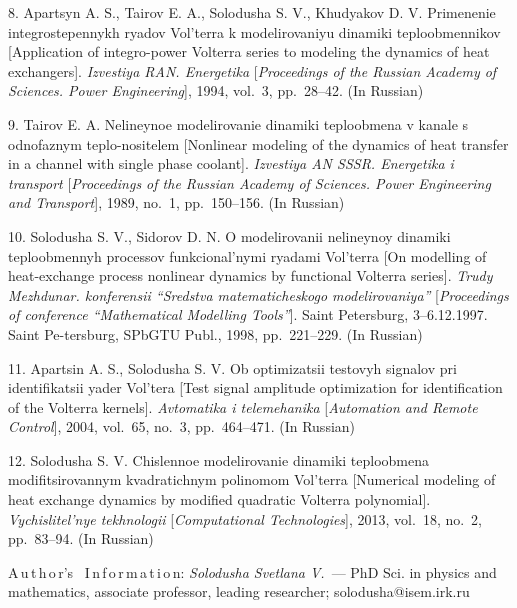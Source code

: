 {8. Apartsyn A. S., Tairov E. A., Solodusha S. V., Khudyakov D. V.
Primenenie integrostepennykh ryadov Vol'terra k modelirovaniyu
dinamiki teploobmennikov [Application of integro-power Volterra
series to modeling the dynamics of heat exchangers]. {\it
Izvestiya RAN. Energetika} [{\it Proceedings of the Russian
Academy of Sciences. Power Engineering}], 1994, vol.~3,
pp.~28--42. (In Russian)

9. Tairov E. A.   Nelineynoe modelirovanie dinamiki teploobmena v
kanale s odnofaznym teplo-\linebreak nositelem [{Nonlinear
modeling of the dynamics of heat transfer in a channel with single
phase coolant}]. {\it Izvestiya AN SSSR. Energetika i transport}
[{\it Proceedings of the Russian Academy of Sciences. Power
Engineering and Transport}], 1989, no.~1, pp.~150--156.  (In
Russian)

10. Solodusha S. V., Sidorov D. N. O modelirovanii nelineynoy
dinamiki teploobmennyh processov funkcional'nymi ryadami Vol'terra
[On modelling of heat-exchange process nonlinear dynamics by
functional Volterra series]. {\it Trudy Mezhdunar. konferensii
``Sredstva matematicheskogo modelirovaniya''}  [{\it Proceedings
of conference ``Mathematical Modelling Tools''}]. Saint
Petersburg, 3--6.12.1997. Saint Pe-\linebreak tersburg, SPbGTU
Publ., 1998, pp.~221--229. (In Russian)

11. Apartsin A. S., Solodusha S. V. Ob optimizatsii testovyh
signalov pri identifikatsii yader Vol'tera [Test signal amplitude
optimization for identification of the Volterra kernels]. {\it
Avtomatika i telemehanika} [{\it Automation and Remote Control}],
2004, vol.~65, no.~3, pp.~464--471. (In Russian)

12. Solodusha S. V. Chislennoe modelirovanie dinamiki teploobmena
modifitsirovannym kvadratichnym polinomom Vol'terra [Numerical
modeling of heat exchange dynamics by modified quadratic Volterra
polynomial]. {\it Vychislitel'nye tekhnologii} [{\it Computational
Technologies}], 2013, vol.~18, no.~2, pp.~83--94. (In Russian)




\vskip5mm A\,u\,t\,h\,o\,r's \ I\,n\,f\,o\,r\,m\,a\,t\,i\,o\,n:
\vskip1.5mm \textit{Solodusha Svetlana V.}~--- PhD Sci. in physics
and mathematics, associate professor, leading researcher;
solodusha@isem.irk.ru






}
